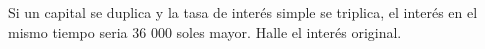 \noindent
Si un capital se duplica y la tasa de interés simple se triplica, el interés en el mismo tiempo seria 36 000 soles mayor. Halle el interés original.
